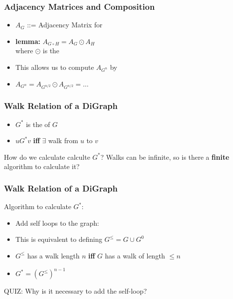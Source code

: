 \documentclass{beamer}
\begin{document}
\begin{frame}
  \frametitle{Adjacency Matrices and Composition}

  {\larger
    \begin{itemize}
    \item $A_G$ ::= Adjacency Matrix for 
    \item {\bf lemma:} $A_{G\circ H} = A_G \odot A_H$\\
      where $\odot$ is the 
      \bigskip

    \item This allows us to compute $A_{G^n}$ by 

    \item $A_{G^n} = A_{G^{n/2}} \odot A_{G^{n/2}} = \ldots$

      \end{itemize}
  }
\end{frame}

\begin{frame}
  \frametitle{Walk Relation of a DiGraph}

  \begin{itemize}
  \item $G^*$ is the  of $G$
  \item $u G^* v$ {\bf iff} $\exists$ walk from $u$ to $v$
    \\
  \end{itemize}

  \vfill
  How do we calculate calculte $G^*$? Walks can be infinite,
  so is there a {\bf finite} algorithm to calculate it?
\end{frame}

\begin{frame}
  \frametitle{Walk Relation of a DiGraph}

  Algorithm to calculate $G^*$:
  \begin{itemize}
  \item Add self loops to the graph:
  \item This is equivalent to defining $G^{\leq} = G \cup G^0$
  \item $G^{\leq}$ has a walk length $n$ {\bf iff}
    $G$ has a walk of length $\leq n$
  \item $G^* = (G^{\leq})^{n-1}$\\
  \end{itemize}
  \vfill

  \alert{QUIZ: Why is it necessary to add the self-loop?}
\end{frame}
\end{document}

